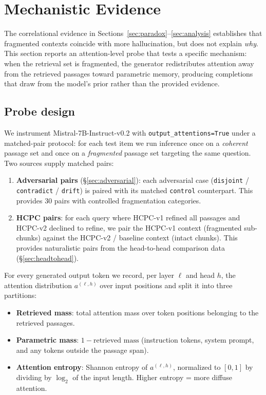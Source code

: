 \section{Mechanistic Evidence}
\label{sec:mechanistic}

The correlational evidence in Sections~\ref{sec:paradox}--\ref{sec:analysis}
establishes that fragmented contexts coincide with more hallucination, but
does not explain \emph{why}. This section reports an attention-level probe
that tests a specific mechanism: when the retrieval set is fragmented, the
generator redistributes attention away from the retrieved passages toward
parametric memory, producing completions that draw from the model's prior
rather than the provided evidence.

\subsection{Probe design}

We instrument Mistral-7B-Instruct-v0.2 with
\texttt{output\_attentions=True} under a matched-pair protocol: for each
test item we run inference once on a \emph{coherent} passage set and once
on a \emph{fragmented} passage set targeting the same question. Two
sources supply matched pairs:

\begin{enumerate}
  \item \textbf{Adversarial pairs} (§\ref{sec:adversarial}): each
        adversarial case (\texttt{disjoint} / \texttt{contradict} /
        \texttt{drift}) is paired with its matched \texttt{control}
        counterpart. This provides 30 pairs with controlled fragmentation
        categories.
  \item \textbf{HCPC pairs}: for each query where HCPC-v1 refined all
        passages and HCPC-v2 declined to refine, we pair the HCPC-v1
        context (fragmented sub-chunks) against the HCPC-v2 / baseline
        context (intact chunks). This provides naturalistic pairs from
        the head-to-head comparison data (§\ref{sec:headtohead}).
\end{enumerate}

For every generated output token we record, per layer $\ell$ and head
$h$, the attention distribution $a^{(\ell,h)}$ over input positions and
split it into three partitions:

\begin{itemize}
  \item \textbf{Retrieved mass}: total attention mass over token positions
        belonging to the retrieved passages.
  \item \textbf{Parametric mass}: $1 - \text{retrieved mass}$ (instruction
        tokens, system prompt, and any tokens outside the passage span).
  \item \textbf{Attention entropy}: Shannon entropy of $a^{(\ell,h)}$,
        normalized to $[0, 1]$ by dividing by $\log_2$ of the input
        length. Higher entropy = more diffuse attention.
\end{itemize}

